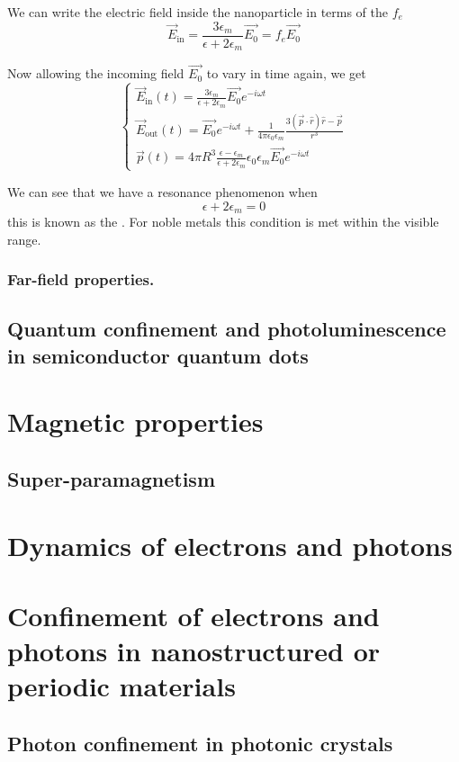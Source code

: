 We can write the electric field inside the nanoparticle in terms of the  $f_e$
\[ \vec{E}_\text{in} = \frac{3\epsilon_m}{\epsilon + 2\epsilon_m}\vec{E_0} = f_e \vec{E_0} \]

Now allowing the incoming field $\vec{E_0}$ to vary in time again, we get
\[ \begin{cases}
\vec{E}_\text{in}(t) = \frac{3\epsilon_m}{\epsilon+2\epsilon_m}\vec{E_0}e^{-i\omega t} \\
\vec{E}_\text{out}(t) = \vec{E_0}e^{-i\omega t} + \frac{1}{4\pi \epsilon_0\epsilon_m}\frac{3(\vec{p}\cdot \hat{r})\hat{r}- \vec{p}}{r^3} \\
\vec{p}(t) = 4\pi R^3 \frac{\epsilon-\epsilon_m}{\epsilon + 2\epsilon_m}\epsilon_0\epsilon_m \vec{E_0}e^{-i\omega t}
\end{cases} \]

We can see that we have a resonance phenomenon when
\[ \epsilon + 2\epsilon_m = 0 \]
this is known as the . For noble metals this condition is met within the visible range.

\subsection{Far-field properties.}

\section{Quantum confinement and photoluminescence in semiconductor quantum dots}
\chapter{Magnetic properties}
\section{Super-paramagnetism}
\chapter{Dynamics of electrons and photons}
\chapter{Confinement of electrons and photons in nanostructured or periodic materials}
\section{Photon confinement in photonic crystals}

